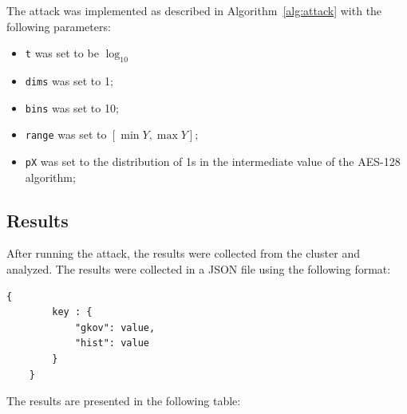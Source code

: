\documentclass[12pt]{article}
\begin{document}
    The attack was implemented as described in Algorithm~\ref{alg:attack} with the following parameters:

    \begin{itemize}
        \item \texttt{t} was set to be $\log_{10}$
        \item \texttt{dims} was set to 1;
        \item \texttt{bins} was set to 10;
        \item \texttt{range} was set to $[\min Y, \max Y]$;
        \item \texttt{pX} was set to the distribution of 1s in the intermediate value of the AES-128 algorithm;
    \end{itemize}

    \subsection{Results}\label{subsec:results}
    After running the attack, the results were collected from the cluster and analyzed.
    The results were collected in a JSON file using the following format:
    \begin{lstlisting}[label={lst:lstlisting}]
    {
        key : {
            "gkov": value,
            "hist": value
        }
    }
    \end{lstlisting}

    The results are presented in the following table:
\end{document}
